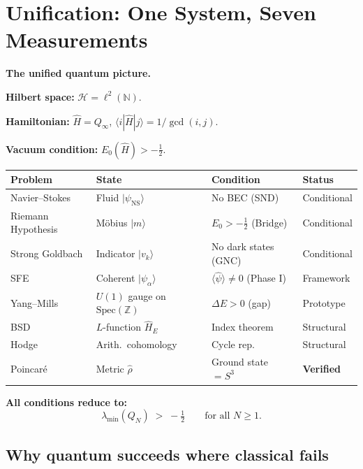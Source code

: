 \documentclass[12pt]{article}
\newcommand{\ket}[1]{|{#1}\rangle}
\newcommand{\bra}[1]{\langle{#1}|}
\newcommand{\Hil}{\mathcal{H}}
\newcommand{\half}{\tfrac{1}{2}}
\begin{document}
\newpage
\section{Unification: One System, Seven Measurements}
\label{sec:unification}

\begin{tcolorbox}[masterbox]
\textbf{The unified quantum picture.}

\textbf{Hilbert space:} $\Hil = \ell^2(\mathbb{N})$.

\textbf{Hamiltonian:} $\hat{H} = Q_\infty$,
$\bra{i}\hat{H}\ket{j} = 1/\gcd(i,j)$.

\textbf{Vacuum condition:} $E_0(\hat{H}) > -\half$.

\medskip
\begin{center}
\renewcommand{\arraystretch}{1.6}
\small
\begin{tabular}{@{}p{2.8cm}p{3.2cm}p{3.0cm}p{2.4cm}@{}}
\toprule
\textbf{Problem} & \textbf{State} & \textbf{Condition} & \textbf{Status}\\
\midrule
Navier--Stokes &
  Fluid $\ket{\psi_{\mathrm{NS}}}$ &
  No BEC (SND) &
  Conditional \\
Riemann Hypothesis &
  M\"{o}bius $\ket{m}$ &
  $E_0>-\half$ (Bridge) &
  Conditional \\
Strong Goldbach &
  Indicator $\ket{v_k}$ &
  No dark states (GNC) &
  Conditional \\
SFE &
  Coherent $\ket{\psi_\alpha}$ &
  $\langle\hat{\psi}\rangle\ne0$ (Phase I) &
  Framework \\
Yang--Mills &
  $U(1)$ gauge on $\mathrm{Spec}(\mathbb{Z})$ &
  $\Delta E>0$ (gap) &
  Prototype \\
BSD &
  $L$-function $\hat{H}_E$ &
  Index theorem &
  Structural \\
Hodge &
  Arith.\ cohomology &
  Cycle rep.\ &
  Structural \\
Poincar\'{e} &
  Metric $\hat{\rho}$ &
  Ground state $=S^3$ &
  \textbf{Verified} \\
\bottomrule
\end{tabular}
\end{center}

\bigskip
\textbf{All conditions reduce to:}
\[
  \boxed{\lambda_{\min}(Q_N) \;>\; -\half \qquad \text{for all } N\ge1.}
\]
\end{tcolorbox}

\subsection{Why quantum succeeds where classical fails}
\end{document}
